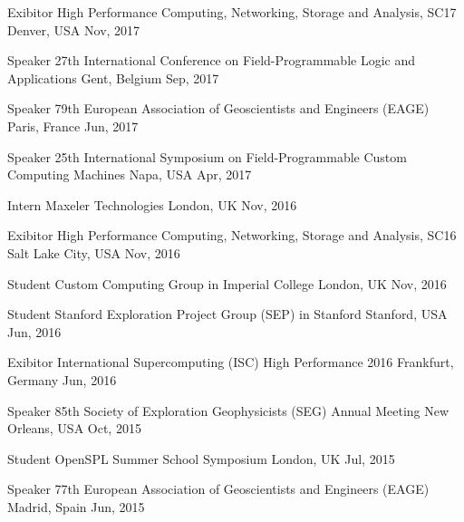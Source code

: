 \documentclass[11pt, a4paper]{awesome-cv}
\begin{document}
\begin{cvhonors}

  \cvhonor
    {Exibitor} %
    {High Performance Computing, Networking, Storage and Analysis, SC17} %
    {Denver, USA} %
    {Nov, 2017} %

  \cvhonor
    {Speaker} %
    {27th International Conference on Field-Programmable Logic and Applications} %
    {Gent, Belgium} %
    {Sep, 2017} %
    
  \cvhonor
    {Speaker} %
    {79th European Association of Geoscientists and Engineers (EAGE)}
    {Paris, France} %
    {Jun, 2017} %

  \cvhonor
    {Speaker} %
    {25th International Symposium on Field-Programmable Custom Computing Machines} %
    {Napa, USA} %
    {Apr, 2017} %
    
  \cvhonor
    {Intern} %
    {Maxeler Technologies} %
    {London, UK} %
    {Nov, 2016} %
    
  \cvhonor
    {Exibitor} %
    {High Performance Computing, Networking, Storage and Analysis, SC16} %
    {Salt Lake City, USA} %
    {Nov, 2016} %

  \cvhonor
    {Student} %
    {Custom Computing Group in Imperial College} %
    {London, UK} %
    {Nov, 2016} %

  \cvhonor
    {Student} %
    {Stanford Exploration Project Group (SEP) in Stanford} %
    {Stanford, USA} %
    {Jun, 2016} %
    
  \cvhonor
    {Exibitor} %
    {International Supercomputing (ISC) High Performance 2016} %
    {Frankfurt, Germany} %
    {Jun, 2016} %

  \cvhonor
    {Speaker} %
    {85th Society of Exploration Geophysicists (SEG) Annual Meeting} %
    {New Orleans, USA}
    {Oct, 2015} %

  \cvhonor
    {Student} %
    {OpenSPL Summer School Symposium} %
    {London, UK} %
    {Jul, 2015} %

  \cvhonor
    {Speaker} %
    {77th European Association of Geoscientists and Engineers (EAGE)} %
    {Madrid, Spain} %
    {Jun, 2015} %
\end{cvhonors}
\end{document}

